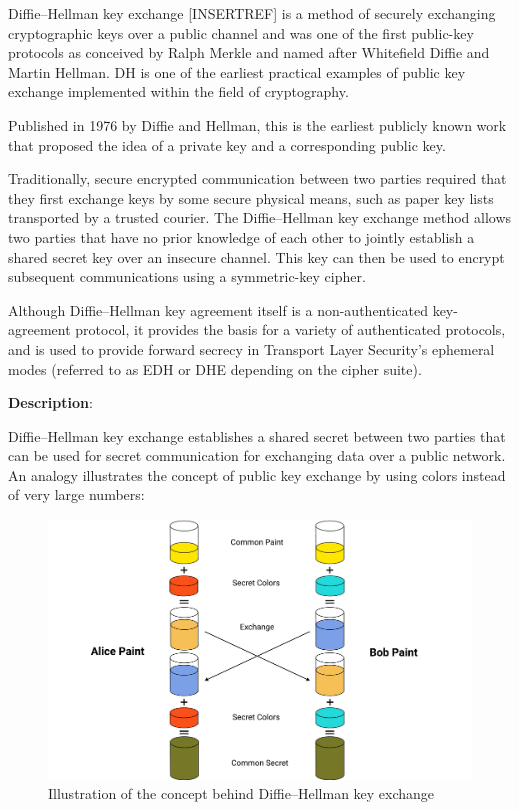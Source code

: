 Diffie–Hellman key exchange [INSERTREF] is a method of securely exchanging cryptographic keys over a public channel
and was one of the first public-key protocols
as conceived by Ralph Merkle and named after Whitefield Diffie and Martin Hellman.
DH is one of the earliest practical examples of public key exchange implemented within the field of cryptography.

Published in 1976 by Diffie and Hellman, this is the earliest publicly known work that proposed the idea of a private
key and a corresponding public key.

Traditionally, secure encrypted communication between two parties required that they first exchange keys by some secure physical means,
such as paper key lists transported by a trusted courier.
The Diffie–Hellman key exchange method allows two parties that have no prior knowledge of
each other to jointly establish a shared secret key over an insecure channel.
This key can then be used to encrypt subsequent communications using a symmetric-key cipher.

Although Diffie–Hellman key agreement itself is a non-authenticated key-agreement protocol, it provides the basis for a
variety of authenticated protocols,
and is used to provide forward secrecy in Transport Layer Security's ephemeral modes
(referred to as EDH or DHE depending on the cipher suite).

\textbf{Description}:

Diffie–Hellman key exchange establishes a shared secret between two parties that can be used for secret communication
for exchanging data over a public network.
An analogy illustrates the concept of public key exchange by using colors instead of very large numbers:

\begin{figure}[H]
    \centering
    \includegraphics[width=1\textwidth]{Pictures/Diffie-Hellman.pdf}
    \caption{Illustration of the concept behind Diffie–Hellman key exchange}\label{fig:figure4}
\end{figure}

